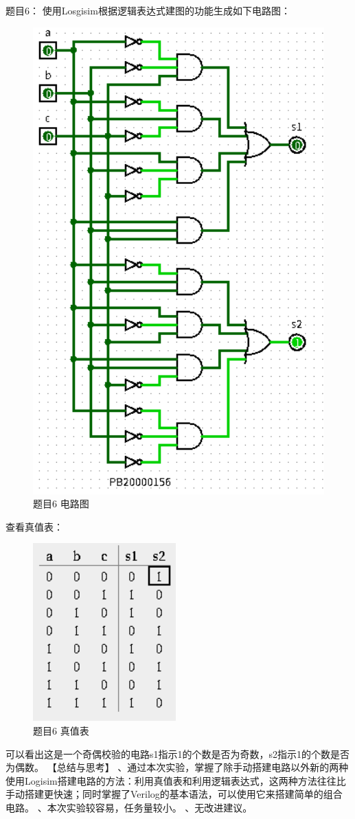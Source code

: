 \documentclass[UTF8]{ctexart}
\begin{document}
题目6：
\newline
使用Losgisim根据逻辑表达式建图的功能生成如下电路图：
\newline
\begin{figure}[h!]
    \centering
    \includegraphics{p6_1.PNG}
    \caption{题目6 电路图}
\end{figure}
查看真值表：
\begin{figure}[h!]
    \centering
    \includegraphics{p6_2.PNG}
    \caption{题目6 真值表}
\end{figure}
可以看出这是一个奇偶校验的电路s1指示1的个数是否为奇数，s2指示1的个数是否为偶数。
【总结与思考】
、通过本次实验，掌握了除手动搭建电路以外新的两种使用Logisim搭建电路的方法：利用真值表和利用逻辑表达式，这两种方法往往比手动搭建更快速；同时掌握了Verilog的基本语法，可以使用它来搭建简单的组合电路。
、本次实验较容易，任务量较小。
、无改进建议。
\end{document}
